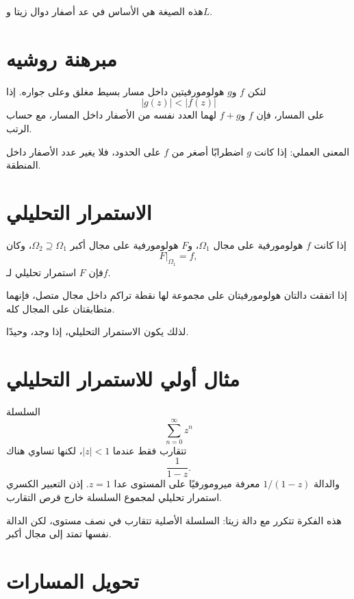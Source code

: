 هذه الصيغة هي الأساس في عد أصفار دوال زيتا و\(L\).

\section{مبرهنة روشيه}

\begin{theorem}[روشيه]
\label{thm:rouche}
لتكن \(f\) و\(g\) هولومورفيتين داخل مسار بسيط مغلق وعلى جواره. إذا
\[
|g(z)|<|f(z)|
\]
على المسار، فإن \(f\) و\(f+g\) لهما العدد نفسه من الأصفار داخل المسار، مع حساب الرتب.
\end{theorem}

المعنى العملي: إذا كانت \(g\) اضطرابًا أصغر من \(f\) على الحدود، فلا يغير عدد الأصفار داخل المنطقة.

\section{الاستمرار التحليلي}

\begin{definition}
إذا كانت \(f\) هولومورفية على مجال \(\Omega_1\)، و\(F\) هولومورفية على مجال أكبر \(\Omega_2\supseteq\Omega_1\)، وكان
\[
F|_{\Omega_1}=f,
\]
فإن \(F\) استمرار تحليلي لـ\(f\).
\end{definition}

\begin{theorem}
\label{thm:identity-theorem}
إذا اتفقت دالتان هولومورفيتان على مجموعة لها نقطة تراكم داخل مجال متصل، فإنهما متطابقتان على المجال كله.
\end{theorem}

لذلك يكون الاستمرار التحليلي، إذا وجد، وحيدًا.

\section{مثال أولي للاستمرار التحليلي}

السلسلة
\[
\sum_{n=0}^{\infty}z^n
\]
تتقارب فقط عندما \(|z|<1\)، لكنها تساوي هناك
\[
\frac{1}{1-z}.
\]
والدالة \(1/(1-z)\) معرفة ميرومورفيًا على المستوى عدا \(z=1\). إذن التعبير الكسري استمرار تحليلي لمجموع السلسلة خارج قرص التقارب.

هذه الفكرة تتكرر مع دالة زيتا: السلسلة الأصلية تتقارب في نصف مستوى، لكن الدالة نفسها تمتد إلى مجال أكبر.

\section{تحويل المسارات}

